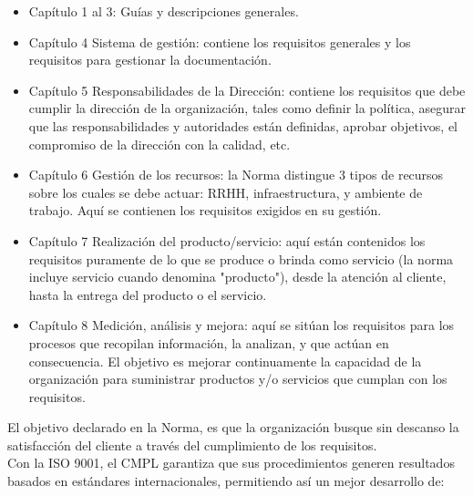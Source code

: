 	\begin{itemize}
		\item Capítulo 1 al 3: Guías y descripciones generales.
		\item Capítulo 4 Sistema de gestión: contiene los requisitos generales y los requisitos para gestionar la documentación.
		\item Capítulo 5 Responsabilidades de la Dirección: contiene los requisitos que debe cumplir la dirección de la organización, tales como definir la política, asegurar que las responsabilidades y autoridades están definidas, aprobar objetivos, el compromiso de la dirección con la calidad, etc.
		\item Capítulo 6 Gestión de los recursos: la Norma distingue 3 tipos de recursos sobre los cuales se debe actuar: RRHH, infraestructura, y ambiente de trabajo. Aquí se contienen los requisitos exigidos en su gestión.
		\item Capítulo 7 Realización del producto/servicio: aquí están contenidos los requisitos puramente de lo que se produce o brinda como servicio (la norma incluye servicio cuando denomina "producto"), desde la atención al cliente, hasta la entrega del producto o el servicio.
		\item Capítulo 8 Medición, análisis y mejora: aquí se sitúan los requisitos para los procesos que recopilan información, la analizan, y que actúan en consecuencia. El objetivo es mejorar continuamente la capacidad de la organización para suministrar productos y/o servicios que cumplan con los requisitos.
	\end{itemize}
	
	El objetivo declarado en la Norma, es que la organización busque sin descanso la satisfacción del cliente a través del cumplimiento de los requisitos. \cite{ISO9001}\\
	
	Con la ISO 9001, el CMPL garantiza que sus procedimientos generen resultados basados en estándares internacionales, permitiendo así un mejor desarrollo de:\\

